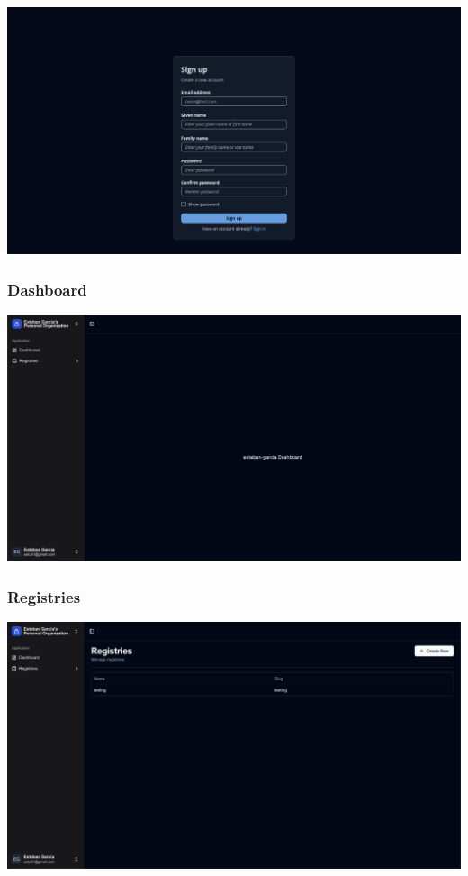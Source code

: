 \documentclass{article}
\begin{document}
  \includegraphics[scale=0.28]{screenshots/signup.png}

  \subsubsection{Dashboard}

  \includegraphics[scale=0.28]{screenshots/dashboard.png} 

  \subsubsection{Registries}

  \includegraphics[scale=0.28]{screenshots/registries.png}
\end{document}
